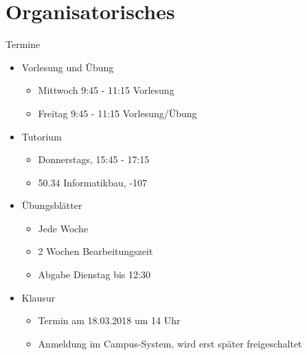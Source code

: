 \documentclass{beamer}
\begin{document}

\begin{frame}
	\titlepage
\end{frame}

\section{Organisatorisches}

\begin{frame}{Termine}
	\begin{itemize}
		 
		\item Vorlesung und Übung
			\begin{itemize}
				\item Mittwoch 9:45 - 11:15 Vorlesung
				\item Freitag 9:45 - 11:15 Vorlesung/Übung
			\end{itemize}
		
		 
		\item Tutorium
			\begin{itemize}
				\item Donnerstags, 15:45 - 17:15
				\item 50.34 Informatikbau, -107
			\end{itemize}
		
		 
		\item Übungsblätter
		\begin{itemize}
			\item Jede Woche
			\item 2 Wochen Bearbeitungszeit
			\item Abgabe Dienstag bis 12:30
		\end{itemize}
		 
		\item Klausur
		\begin{itemize}
			\item Termin am 18.03.2018 um 14 Uhr
			\item Anmeldung im Campus-System, wird erst später freigeschaltet
		\end{itemize}
	\end{itemize}
\end{frame}
\end{document}
